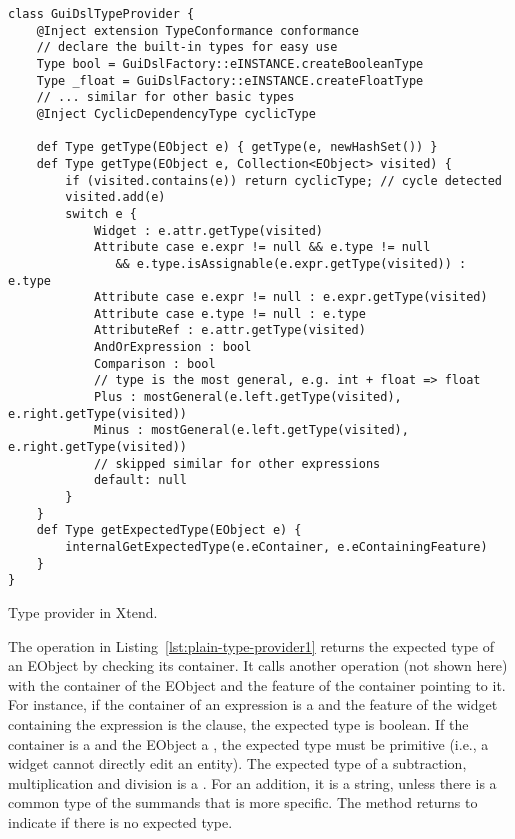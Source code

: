 \begin{listing}[tb]
\begin{lstlisting}[language=xtend] 
class GuiDslTypeProvider {
	@Inject extension TypeConformance conformance
	// declare the built-in types for easy use
	Type bool = GuiDslFactory::eINSTANCE.createBooleanType
	Type _float = GuiDslFactory::eINSTANCE.createFloatType
	// ... similar for other basic types
	@Inject CyclicDependencyType cyclicType

	def Type getType(EObject e) { getType(e, newHashSet()) }
	def Type getType(EObject e, Collection<EObject> visited) {
		if (visited.contains(e)) return cyclicType; // cycle detected
		visited.add(e)
		switch e {
			Widget : e.attr.getType(visited)
			Attribute case e.expr != null && e.type != null 
			   && e.type.isAssignable(e.expr.getType(visited)) : e.type
			Attribute case e.expr != null : e.expr.getType(visited)
			Attribute case e.type != null : e.type
			AttributeRef : e.attr.getType(visited)
			AndOrExpression : bool 
			Comparison : bool
			// type is the most general, e.g. int + float => float
			Plus : mostGeneral(e.left.getType(visited), e.right.getType(visited))
			Minus : mostGeneral(e.left.getType(visited), e.right.getType(visited))
			// skipped similar for other expressions
			default: null
		}
	} 
	def Type getExpectedType(EObject e) {
		internalGetExpectedType(e.eContainer, e.eContainingFeature) 
	} 
}
\end{lstlisting}
\label{lst:plain-type-provider1}
\caption{Type provider in Xtend.}
\end{listing}

The operation  in Listing~\ref{lst:plain-type-provider1}
returns the expected type of an EObject by checking its container. It calls
another operation (not shown here) with the container of the EObject and the
feature of the container pointing to it. For instance, if the container of an
expression is a  and the feature of the widget containing the
expression is the  clause, the expected type is boolean. If the
container is a  and the EObject a , the expected type
must be primitive (i.e., a widget cannot directly edit an entity).
The expected type of a subtraction, multiplication and division is a
. For an addition, it is a string, unless there is a common
type of the summands that is more specific. The method returns  to
indicate if there is no expected type.

